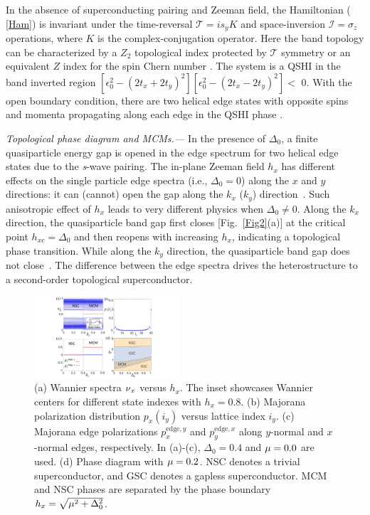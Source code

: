\documentclass[twocolumn,prl,floatfix,citeautoscript,nofootinbib,superscriptaddress]{revtex4}
\begin{document}
In the absence of superconducting pairing and Zeeman field, the Hamiltonian (%
\ref{Ham}) is invariant under the time-reversal $\mathcal{T}=is_{y}K$ and
space-inversion $\mathcal{I}=\sigma _{z}$ operations, where $K$ is the
complex-conjugation operator. Here the band topology can be characterized by
a $Z_{2}$ topological index protected by $\mathcal{T}$ symmetry or an
equivalent $Z$ index for the spin Chern number \cite{He2016}. The system is
a QSHI in the band inverted region $\left[ \epsilon _{0}^{2}-\left(
2t_{x}+2t_{y}\right) ^{2}\right] \left[ \epsilon _{0}^{2}-\left(
2t_{x}-2t_{y}\right) ^{2}\right] <$ $0$. With the open boundary condition,
there are two helical edge states with opposite spins and momenta
propagating along each edge in the QSHI phase \cite{Hansan2010,Qix2011}.

{\color{blue}\emph{Topological phase diagram and MCMs.{--- }}}In the
presence of $\Delta _{0}$, a finite quasiparticle energy gap is opened in
the edge spectrum for two helical edge states due to the \textit{s}-wave
pairing. The in-plane Zeeman field $h_{x}$ has different effects on the
single particle edge spectra (i.e., $\Delta _{0}=0$) along the $x$ and $y$
directions: it can (cannot) open the gap along the $k_{x}$ ($k_{y}$)
direction~\cite{SM}. Such anisotropic effect of $h_{x}$ leads to very
different physics when $\Delta _{0}\neq 0$. Along the $k_{x}$ direction, the
quasiparticle band gap first closes [Fig.~\ref{Fig2}(a)] at the critical
point $h_{xc}=\Delta _{0}$ and then reopens with increasing $h_{x}$,
indicating a topological phase transition. While along the $k_{y}$
direction, the quasiparticle band gap does not close~\cite{SM}.
The difference between the edge spectra drives the heterostructure to a
second-order topological superconductor.

\begin{figure}[tbp]
\centering\includegraphics[width=0.48\textwidth]{Fig3.pdf}
\caption{ (a) Wannier spectra $\protect\nu _{x}$ versus $h_{x}$. The inset
showcases Wannier centers for different state indexes with $h_{x}=0.8$. (b)
Majorana polarization distribution $p_{x}\left( i_{y}\right) $ versus
lattice index $i_{y}$. (c) Majorana edge polarizations $p_{x}^{\mathrm{edge}%
,y}$ and $p_{y}^{\mathrm{edge},x}$ along $y$-normal and $x$-normal edges,
respectively. In (a)-(c), $\Delta _{0}=0.4$ and $\protect\mu =0.0$ are used.
(d) Phase diagram with $\protect\mu =0.2$. NSC denotes a trivial
superconductor, and GSC denotes a gapless superconductor. MCM and NSC phases
are separated by the phase boundary $h_{x}=\protect\sqrt{\protect\mu %
^{2}+\Delta _{0}^{2}}$.}
\label{Fig3}
\end{figure}
\end{document}
